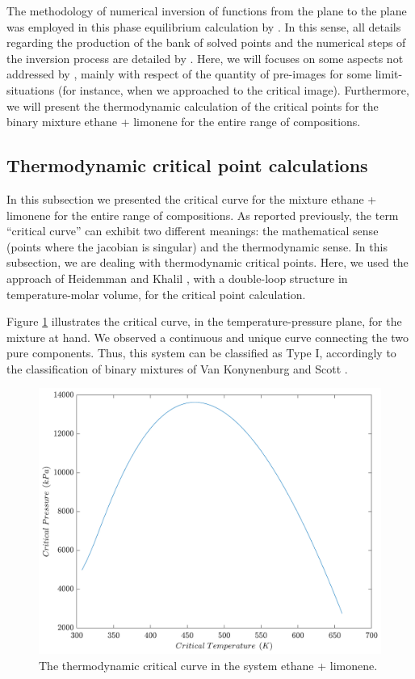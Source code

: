 \documentclass{article}
\theoremstyle{definition}
\theoremstyle{remark}
\begin{document}
The methodology of numerical inversion of functions from the plane to the plane \cite{malta} was employed in this phase equilibrium calculation by \cite{ireme}. In this sense, all details regarding the production of the bank of solved points and the numerical steps of the inversion process are detailed by \cite{ireme}. Here, we will focuses on some aspects not addressed by \cite{ireme}, mainly with respect of the quantity of pre-images for some limit-situations (for instance, when we approached to the critical image). Furthermore, we will present the thermodynamic calculation of the critical points for the binary mixture ethane + limonene for the entire range of compositions.
 
\subsection{Thermodynamic critical point calculations}

In this subsection we presented the critical curve for the mixture ethane + limonene for the entire range of compositions. As reported previously, the term ``critical curve'' can exhibit two different meanings: the mathematical sense (points where the jacobian is singular) and the thermodynamic sense. In this subsection, we are dealing with thermodynamic critical points. Here, we used the approach of Heidemman and Khalil \cite{heidemman}, with a double-loop structure in temperature-molar volume, for the critical point calculation.

Figure \ref{fig:critical_thermo} illustrates the critical curve, in the temperature-pressure plane, for the mixture at hand. We observed a continuous and unique curve connecting the two pure components. Thus, this system can be classified as Type I, accordingly to the classification of binary mixtures of Van Konynenburg and Scott \cite{classif}.

\begin{figure}
	\begin{center}
		\includegraphics[scale=0.50]{temperatura_pressao.pdf}
		\caption{The thermodynamic critical curve in the system ethane + limonene.}\label{fig:critical_thermo}
	\end{center}
\end{figure}
\end{document}
